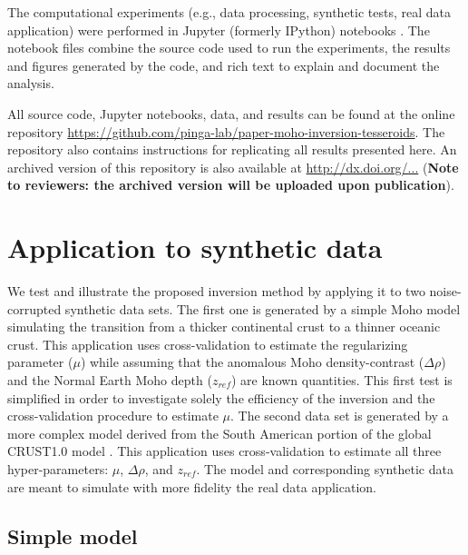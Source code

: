 The computational experiments
(e.g., data processing, synthetic tests, real data application)
were performed in
Jupyter (formerly IPython) notebooks
\citep[][ \url{http://jupyter.org/}]{perez2007}.
The notebook files combine the source code used to run the experiments,
the results and figures generated by the code,
and rich text to explain and document the analysis.

All source code, Jupyter notebooks, data, and results
can be found at the online repository
\url{https://github.com/pinga-lab/paper-moho-inversion-tesseroids}.
The repository also contains instructions for replicating all results presented
here.
An archived version of this repository is also available at
\url{http://dx.doi.org/...}
(\textbf{Note to reviewers: the archived version will be uploaded upon
publication}).


\section{Application to synthetic data}

We test and illustrate the proposed inversion method
by applying it to two noise-corrupted synthetic data sets.
The first one is generated by a simple Moho model simulating the transition
from a thicker continental crust to a thinner oceanic crust.
This application uses cross-validation to estimate the regularizing parameter
($\mu$) while assuming that the anomalous Moho density-contrast ($\Delta\rho$)
and the Normal Earth Moho depth ($z_{ref}$) are known quantities.
This first test is simplified in order to investigate solely
the efficiency of the inversion and
the cross-validation procedure to estimate $\mu$.
The second data set is generated by a more complex model derived from
the South American portion of the global CRUST1.0 model \citep{laske2013}.
This application uses cross-validation to estimate all three hyper-parameters:
$\mu$, $\Delta\rho$, and $z_{ref}$.
The model and corresponding synthetic data are meant to simulate
with more fidelity the real data application.


\subsection{Simple model}\label{sec:simple-synthetic}


